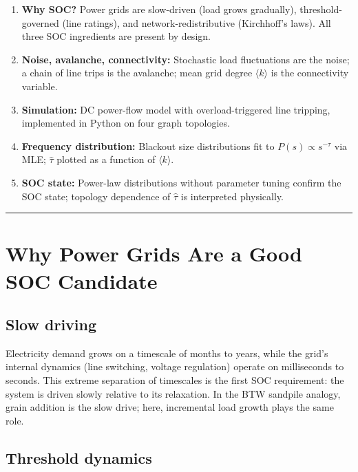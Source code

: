 \documentclass[12pt,a4paper]{article}
\begin{document}
\begin{enumerate}[leftmargin=*, label=(\roman*)]
    \item \textbf{Why SOC?} Power grids are slow-driven (load grows
          gradually), threshold-governed (line ratings), and
          network-redistributive (Kirchhoff's laws). All three SOC
          ingredients are present by design.
    \item \textbf{Noise, avalanche, connectivity:} Stochastic load
          fluctuations are the noise; a chain of line trips is the
          avalanche; mean grid degree $\langle k \rangle$ is the
          connectivity variable.
    \item \textbf{Simulation:} DC power-flow model with overload-triggered
          line tripping, implemented in Python on four graph topologies.
    \item \textbf{Frequency distribution:} Blackout size distributions fit
          to $P(s) \propto s^{-\tau}$ via MLE; $\hat{\tau}$ plotted as a
          function of $\langle k \rangle$.
    \item \textbf{SOC state:} Power-law distributions without parameter
          tuning confirm the SOC state; topology dependence of $\hat{\tau}$
          is interpreted physically.
\end{enumerate}

\vspace{1.5em}
\hrule

\section{Why Power Grids Are a Good SOC Candidate}
\label{sec:why}

\subsection{Slow driving}

Electricity demand grows on a timescale of months to years, while
the grid's internal dynamics (line switching, voltage regulation)
operate on milliseconds to seconds. This extreme separation of
timescales is the first SOC requirement: the system is driven slowly
relative to its relaxation. In the BTW sandpile analogy, grain
addition is the slow drive; here, incremental load growth plays the
same role.

\subsection{Threshold dynamics}
\end{document}
